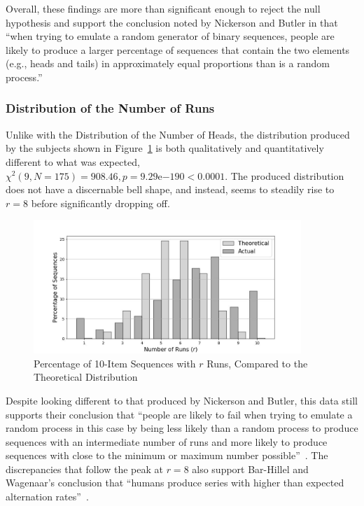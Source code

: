 Overall, these findings are more than significant enough to reject the null hypothesis and support the conclusion noted by Nickerson and Butler in that ``when trying to emulate a random generator of binary sequences, people are likely to produce a larger percentage of sequences that contain the two elements (e.g., heads and tails) in approximately equal proportions than is a random process.''~\cite{nickerson:2009}

\subsubsection{Distribution of the Number of Runs}
Unlike with the Distribution of the Number of Heads, the distribution produced by the subjects shown in Figure~\ref{distribution_of_the_number_of_runs} is both qualitatively and quantitatively different to what was expected, $\chi^2(9, N=175) = 908.46, p=9.29\mathrm{e}{-190} < 0.0001$. The produced distribution does not have a discernable bell shape, and instead, seems to steadily rise to $r = 8$ before significantly dropping off. 


\begin{figure}[h]
    \centering
    \includegraphics[width=0.9\textwidth]{images/combined_number_of_runs.jpg}
    \caption{Percentage of 10-Item Sequences with $r$ Runs, Compared to the Theoretical Distribution}
    \label{distribution_of_the_number_of_runs}
\end{figure}

Despite looking different to that produced by Nickerson and Butler, this data still supports their conclusion that ``people are likely to fail when trying to emulate a random process \textendash{} in this case by being less likely than a random process to produce sequences with an intermediate number of runs and more likely to produce sequences with close to the minimum or maximum number possible''~\cite{nickerson:2009}. The discrepancies that follow the peak at $r = 8$ also support Bar-Hillel and Wagenaar's conclusion that ``humans produce series with higher than expected alternation rates''~\cite{bar-hillel:1991}.

